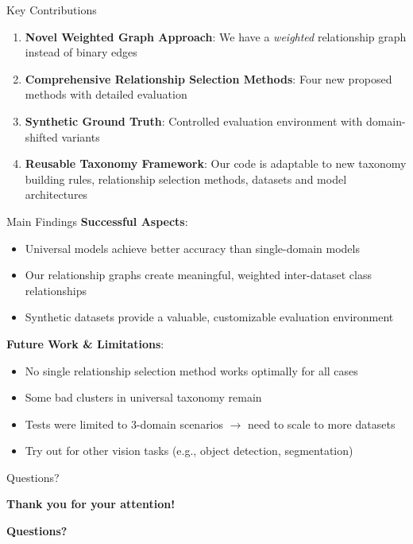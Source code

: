 \documentclass[aspectratio=169]{beamer}
\begin{document}
\begin{frame}{Key Contributions}
    \begin{enumerate}
        \item \textbf{Novel Weighted Graph Approach}: We have a \textit{weighted} relationship graph instead of binary edges

        \item \textbf{Comprehensive Relationship Selection Methods}: Four new proposed methods with detailed evaluation

        \item \textbf{Synthetic Ground Truth}: Controlled evaluation environment with domain-shifted variants

        \item \textbf{Reusable Taxonomy Framework}: Our code is adaptable to new taxonomy building rules,
              relationship selection methods, datasets and model architectures
    \end{enumerate}
\end{frame}

\begin{frame}{Main Findings}
    \textbf{Successful Aspects}:
    \begin{itemize}
        \item Universal models achieve better accuracy than single-domain models
        \item Our relationship graphs create meaningful, weighted inter-dataset class relationships
        \item Synthetic datasets provide a valuable, customizable evaluation environment
    \end{itemize}

    \vspace{1em}

    \textbf{Future Work \& Limitations}:
    \begin{itemize}
        \item No single relationship selection method works optimally for all cases
        \item Some bad clusters in universal taxonomy remain
        \item Tests were limited to 3-domain scenarios $\rightarrow$ need to scale to more datasets
        \item Try out for other vision tasks (e.g., object detection, segmentation)
    \end{itemize}
\end{frame}

\begin{frame}{Questions?}
    \begin{center}
        \textbf{\Large Thank you for your attention!}

        \vspace{1em}

        \textbf{Questions?}
    \end{center}
\end{frame}
\end{document}
